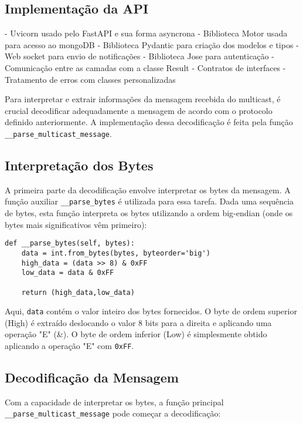 \subsection[Implementação da API]{Implementação da API}

- Uvicorn usado pelo FastAPI e sua forma asyncrona
- Biblioteca Motor usada para acesso ao mongoDB
- Biblioteca Pydantic para criação dos modelos e tipos
- Web socket para envio de notificações
- Biblioteca Jose para autenticação
- Comunicação entre as camadas com a classe Result
- Contratos de interfaces
- Tratamento de erros com classes personalizadas




Para interpretar e extrair informações da mensagem recebida do multicast, é crucial decodificar adequadamente a mensagem de acordo com o protocolo definido anteriormente. A implementação dessa decodificação é feita pela função \texttt{\_\_parse\_multicast\_message}. 

\subsection{Interpretação dos Bytes}

A primeira parte da decodificação envolve interpretar os bytes da mensagem. A função auxiliar \texttt{\_\_parse\_bytes} é utilizada para essa tarefa. Dada uma sequência de bytes, esta função interpreta os bytes utilizando a ordem big-endian (onde os bytes mais significativos vêm primeiro):

\begin{verbatim}
def __parse_bytes(self, bytes):
    data = int.from_bytes(bytes, byteorder='big')
    high_data = (data >> 8) & 0xFF
    low_data = data & 0xFF

    return (high_data,low_data)
\end{verbatim}

Aqui, \texttt{data} contém o valor inteiro dos bytes fornecidos. O byte de ordem superior (High) é extraído deslocando o valor 8 bits para a direita e aplicando uma operação "E" (\&). O byte de ordem inferior (Low) é simplesmente obtido aplicando a operação "E" com \texttt{0xFF}.

\subsection{Decodificação da Mensagem}

Com a capacidade de interpretar os bytes, a função principal \texttt{\_\_parse\_multicast\_message} pode começar a decodificação:

